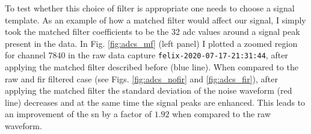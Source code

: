 To test whether this choice of filter is appropriate one needs to choose a signal template. As an example of how a matched filter would affect our signal, I simply took the matched filter coefficients to be the 32 \gls{adc} values around a signal peak present in the data. In Fig. \ref{fig:adcs_mf} (left panel) I plotted a zoomed region for channel $7840$ in the raw data capture \texttt{felix-2020-07-17-21:31:44}, after applying the matched filter described before (blue line). When compared to the raw and \gls{fir} filtered case (see Figs. \ref{fig:adcs_nofir} and \ref{fig:adcs_fir}), after applying the matched filter the standard deviation of the noise waveform (red line) decreases and at the same time the signal peaks are enhanced. This leads to an improvement of the \gls{sn} by a factor of $1.92$ when compared to the raw waveform.

